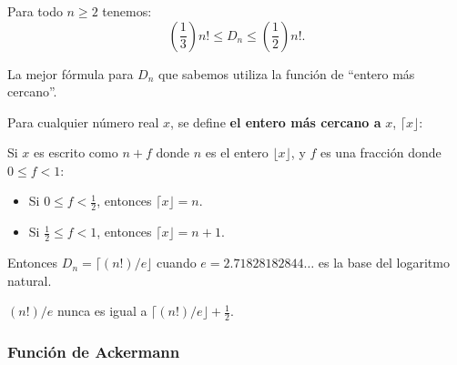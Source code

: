 \begin{frame}
\frametitle{\subsecname}

\begin{theorem}
Para todo $n\geq2$ tenemos: \[ \left(\frac{1}{3}\right)n!\leq D_{n}\leq\left(\frac{1}{2}\right)n!. \]
\end{theorem}

La mejor fórmula para $D_{n}$ que sabemos utiliza la función de ``entero más cercano''.

\begin{definition}
	Para cualquier número real $x$, se define \textbf{el entero más cercano a} $x$, $\lceil x\rfloor$:

	Si $x$ es escrito como $n+f$ donde $n$ es el entero $\lfloor x\rfloor$, y $f$ es una fracción donde $0\leq f<1$:

	\begin{itemize}
		\item Si $0\leq f<\frac{1}{2}$, entonces $\lceil x\rfloor=n$.
		\item Si $\frac{1}{2}\leq f<1$, entonces $\lceil x\rfloor=n+1$.
	\end{itemize}
\end{definition}

\begin{remark}
	Entonces $D_{n}=\lceil(n!)/e\rfloor$ cuando $e=2.71828182844\ldots$ es la base del logaritmo natural.

	$(n!)/e$  nunca es igual a $\lceil(n!)/e\rfloor+\frac{1}{2}$.
\end{remark}
\end{frame}

\subsubsection{Función de Ackermann}


